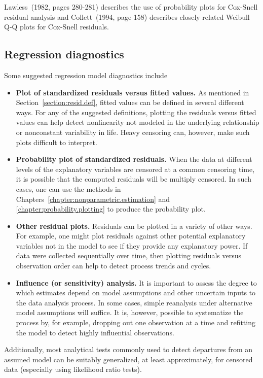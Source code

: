 Lawless~(1982, pages 280-281) describes the use of probability plots
for Cox-Snell residual analysis and Collett~(1994, page 158)
describes closely related Weibull Q-Q plots for Cox-Snell residuals.

 
\subsection{Regression diagnostics}
\label{section:regression.diag}
Some suggested regression model diagnostics include
\begin{itemize}
\item
{\bf Plot of standardized residuals versus fitted values.} As
mentioned in Section~\ref{section:resid.def}, fitted values can be
defined in several different ways.  For any of the suggested
definitions, plotting the residuals versus fitted values can help
detect  nonlinearity not modeled in the underlying relationship or
nonconstant variability in life. Heavy censoring can, however,
make such plots difficult to interpret.
\item
{\bf Probability plot of standardized residuals.} When the data at
different levels of the explanatory variables are censored at a common
censoring time, it is possible that the computed residuals will be
multiply censored. In such cases, one can use the methods
in Chapters~\ref{chapter:nonparametric.estimation} and
\ref{chapter:probability.plotting} to produce the probability plot.

\item
{\bf Other residual plots.} Residuals can be plotted in a variety of
other ways. For example, one might plot residuals against other
potential explanatory variables not in the model
to see if they provide any explanatory
power. If data were collected sequentially over time, then plotting
residuals versus observation order can help to detect process trends
and cycles.
\item
{\bf Influence (or sensitivity) analysis.} It is important to
assess the degree to which estimates depend on model assumptions and
other uncertain inputs to the data analysis process. In some cases, simple
reanalysis under alternative model assumptions will suffice.  It is,
however, possible to systematize the process by, for example, dropping
out one observation at a time and refitting the model to detect highly
influential observations.
\end{itemize}
Additionally, most analytical tests commonly used to detect departures
from an assumed model can be suitably generalized, at least
approximately, for censored data (especially using likelihood ratio
tests).

